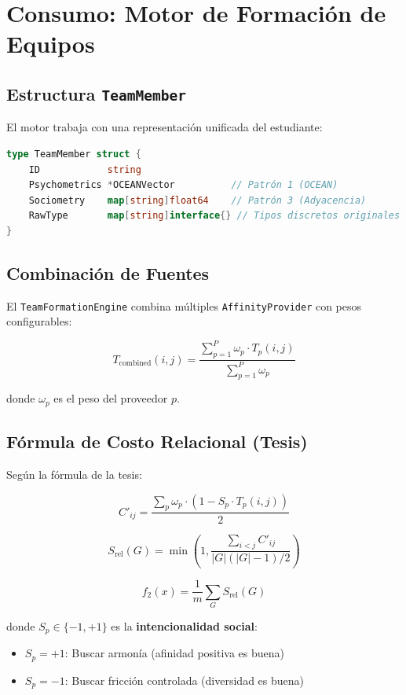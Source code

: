 \documentclass[12pt,a4paper]{article}
\begin{document}
\section{Consumo: Motor de Formación de Equipos}
\label{sec:engine}

\subsection{Estructura \texttt{TeamMember}}

El motor trabaja con una representación unificada del estudiante:

\begin{lstlisting}[language=Go]
type TeamMember struct {
    ID            string
    Psychometrics *OCEANVector          // Patrón 1 (OCEAN)
    Sociometry    map[string]float64    // Patrón 3 (Adyacencia)
    RawType       map[string]interface{} // Tipos discretos originales
}
\end{lstlisting}

\subsection{Combinación de Fuentes}

El \texttt{TeamFormationEngine} combina múltiples \texttt{AffinityProvider} con pesos configurables:

\[
T_{\text{combined}}(i, j) = \frac{\sum_{p=1}^{P} \omega_p \cdot T_p(i, j)}{\sum_{p=1}^{P} \omega_p}
\]

donde $\omega_p$ es el peso del proveedor $p$.

\subsection{Fórmula de Costo Relacional (Tesis)}

Según la fórmula de la tesis:

\[
C'_{ij} = \frac{\sum_p \omega_p \cdot (1 - S_p \cdot T_p(i,j))}{2}
\]

\[
S_{\text{rel}}(G) = \min\left(1, \frac{\sum_{i<j} C'_{ij}}{|G|(|G|-1)/2}\right)
\]

\[
f_2(x) = \frac{1}{m} \sum_G S_{\text{rel}}(G)
\]

donde $S_p \in \{-1, +1\}$ es la \textbf{intencionalidad social}:
\begin{itemize}
    \item $S_p = +1$: Buscar armonía (afinidad positiva es buena)
    \item $S_p = -1$: Buscar fricción controlada (diversidad es buena)
\end{itemize}
\end{document}
